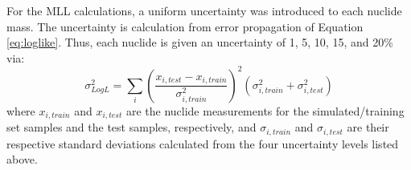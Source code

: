 For the \gls{MLL} calculations, a uniform uncertainty was introduced to each
nuclide mass.  The uncertainty is calculation from error propagation of
Equation \ref{eq:loglike}.  Thus, each nuclide is given an uncertainty of 1, 5,
10, 15, and 20\% via:
\begin{equation}
  \sigma_{Log L}^2 = \sum_i \left( 
                            \frac{x_{i,test} - x_{i,train}}{\sigma_{i,train}^2}
                            \right)^2 
                            (\sigma_{i,train}^2 + \sigma_{i,test}^2)
  \label{eq:mllunc}
\end{equation}
where $x_{i,train}$ and $x_{i,test}$ are the nuclide measurements for the
simulated/training set samples and the test samples, respectively, and
$\sigma_{i,train}$ and $\sigma_{i,test}$ are their respective standard
deviations calculated from the four uncertainty levels listed above.  
